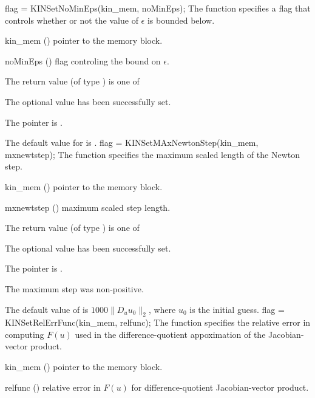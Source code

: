 {
flag = KINSetNoMinEps(kin\_mem, noMinEps);
}
{
  The function  specifies a flag that controls whether or not
  the value of $\epsilon$ is bounded below.
}
{
  \begin{args}[noMinEps]
  \item[kin\_mem] ()
    pointer to the {\kinsol} memory block.
  \item[noMinEps] ()
    flag controling the bound on $\epsilon$.
  \end{args}
}
{
  The return value  (of type ) is one of
  \begin{args}
  \item[\Id{KIN\_SUCCESS}] 
    The optional value has been successfully set.
  \item[\Id{KIN\_MEM\_NULL}]
    The  pointer is .
  \end{args}
}
{
  The default value for  is .
}
{
flag = KINSetMAxNewtonStep(kin\_mem, mxnewtstep);
}
{
  The function  specifies the maximum scaled
  length of the Newton step.
}
{
  \begin{args}[mxnewtstep]
  \item[kin\_mem] ()
    pointer to the {\kinsol} memory block.
  \item[mxnewtstep] ()
    maximum scaled step length.
  \end{args}
}
{
  The return value  (of type ) is one of
  \begin{args}
  \item[\Id{KIN\_SUCCESS}] 
    The optional value has been successfully set.
  \item[\Id{KIN\_MEM\_NULL}]
    The  pointer is .
  \item[\Id{KIN\_ILL\_INPUT}]
    The maximum step was non-positive.
  \end{args}
}
{
  The default value of  is $1000 \| D_u u_0 \|_2$,
  where $u_0$ is the initial guess.
}
{
flag = KINSetRelErrFunc(kin\_mem, relfunc);
}
{
  The function  specifies the relative error in 
  computing $F(u)$ used in the difference-quotient appoximation of the
  Jacobian-vector product.
}
{
  \begin{args}[relfunc]
  \item[kin\_mem] ()
    pointer to the {\kinsol} memory block.
  \item[relfunc] ()
    relative error in $F(u)$ for difference-quotient Jacobian-vector
    product.
  \end{args}
}
